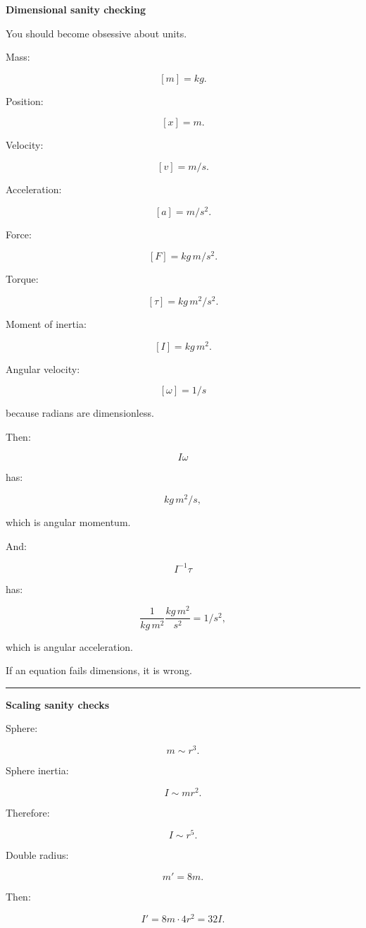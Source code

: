 \textbf{Dimensional sanity checking}

You should become obsessive about units.

Mass:

\[
[m]=kg.
\]

Position:

\[
[x]=m.
\]

Velocity:

\[
[v]=m/s.
\]

Acceleration:

\[
[a]=m/s^2.
\]

Force:

\[
[F]=kg\,m/s^2.
\]

Torque:

\[
[\tau]=kg\,m^2/s^2.
\]

Moment of inertia:

\[
[I]=kg\,m^2.
\]

Angular velocity:

\[
[\omega]=1/s
\]

because radians are dimensionless.

Then:

\[
I\omega
\]

has:

\[
kg\,m^2/s,
\]

which is angular momentum.

And:

\[
I^{-1}\tau
\]

has:

\[
\frac1{kg\,m^2}
\frac{kg\,m^2}{s^2}
=
1/s^2,
\]

which is angular acceleration.

If an equation fails dimensions, it is wrong.

\begin{center}\rule{0.5\linewidth}{0.5pt}\end{center}

\textbf{Scaling sanity checks}

Sphere:

\[
m\sim r^3.
\]

Sphere inertia:

\[
I\sim mr^2.
\]

Therefore:

\[
I\sim r^5.
\]

Double radius:

\[
m'=8m.
\]

Then:

\[
I'
=
8m\cdot4r^2
=
32I.
\]

